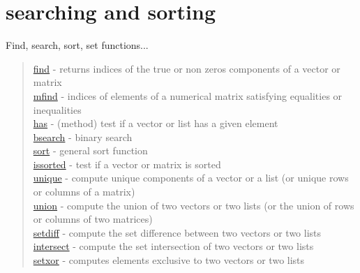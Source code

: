 \chapter*{searching and sorting}
\hypertarget{searchandsort}{}
Find, search, sort, set functions...

\begin{quote}
\noindent
\hyperlink{find}{find} - returns indices of the true or non zeros
components of a vector or matrix \\
\hyperlink{mfind}{mfind} - indices of elements of a numerical matrix satisfying equalities or inequalities\\
\hyperlink{has}{has} - (method) test if a vector or list has a given element\\
\hyperlink{bsearch}{bsearch} - binary search \\
\hyperlink{sort}{sort} - general sort function \\
\hyperlink{issorted}{issorted} - test if a vector or matrix is sorted \\
\hyperlink{unique}{unique} - compute unique components of a vector or a list (or unique rows or columns of a matrix) \\
\hyperlink{union}{union} - compute the union of two vectors or two lists (or the union of rows or columns of two matrices) \\
\hyperlink{setdiff}{setdiff} - compute the set difference between two vectors or two lists\\
\hyperlink{intersect}{intersect} - compute the set intersection of two vectors or two lists\\
\hyperlink{setxor}{setxor} - computes elements exclusive to two vectors or two lists\\
\end{quote}

 
 
 
 
 

 
 
 
  
 
